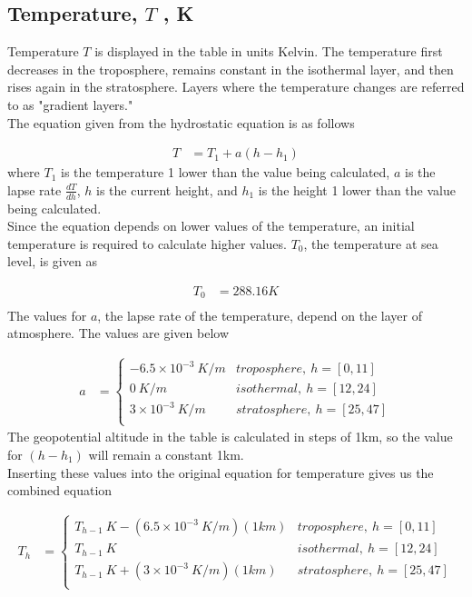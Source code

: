 \documentclass{article}
\begin{document}
\subsection{Temperature, \texorpdfstring{$T$}{} , K}
Temperature $T$ is displayed in the table in units Kelvin. The temperature first decreases in the troposphere, remains constant in the isothermal layer, and then rises again in the stratosphere. Layers where the temperature changes are referred to as "gradient layers." \\
The equation given from the hydrostatic equation is as follows

\begin{align*}
    T &= T_1 + a(h - h_1)
\end{align*}
where $T_1$ is the temperature 1 lower than the value being calculated, $a$ is the lapse rate $\frac{dT}{dh}$, $h$ is the current height, and $h_1$ is the height 1 lower than the value being calculated. \\ 
Since the equation depends on lower values of the temperature, an initial temperature is required to calculate higher values. $T_0$, the temperature at sea level, is given as 

\begin{align*}
    T_{0} &= 288.16 K \\
\end{align*}
The values for $a$, the lapse rate of the temperature, depend on the layer of atmosphere. The values are given below

\begin{align*}
    a &= \begin{cases}
    -6.5\times10^{-3}\  K/m   & troposphere,\ h = [0,11] \\
    0 \ K/m                  & isothermal,\ h = [12,24] \\
    3\times10^{-3}\ K/m     & stratosphere,\ h = [25,47] \\
    \end{cases}
\end{align*}
The geopotential altitude in the table is calculated in steps of 1km, so the value for $(h-h_1)$ will remain a constant 1km.\\
Inserting these values into the original equation for temperature gives us the combined equation

\begin{align}
    T_h &= \begin{cases}
    T_{h-1}\ K - (6.5\times10^{-3}\  K/m)(1km)    & troposphere,\ h = [0,11] \\
    T_{h-1} \ K                                          & isothermal,\ h = [12,24] \\
    T_{h-1}\ K + (3\times10^{-3}\ K/m)(1km)       & stratosphere,\ h = [25,47] \\
    \end{cases}
\end{align}
\end{document}
